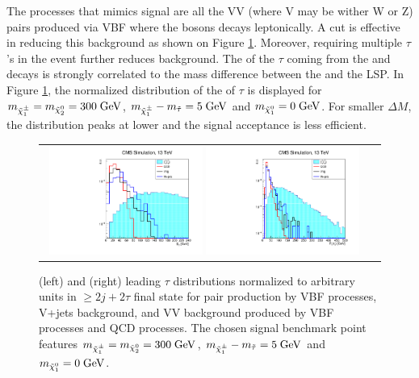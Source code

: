 The processes that mimics signal are all the VV (where V may be wither W or Z) pairs produced via VBF where the bosons decays leptonically. A \met cut is eﬀective in reducing this background as shown on Figure \ref{fig:VBF_met_pttau}. Moreover, requiring multiple $\tau$’s in the event further reduces background. The \pt of the \ensuremath{\tau} coming from the \charginopm and \neutralinotwo decays is strongly correlated to the mass difference between the \charginopm and the \neutralinoone LSP. In Figure \ref{fig:VBF_met_pttau}, the normalized distribution of the \pt of \ensuremath{\tau} is displayed for \ensuremath{m_{\charginopm} = m_{\neutralinotwo} = 300\gev}, \ensuremath{m_{\charginopm} - m_{\tilde{\tau}} = 5\gev} and \ensuremath{m_{\neutralinoone} = 0\gev}. For smaller \ensuremath{\Delta M}, the distribution peaks at lower \pt and the signal acceptance is less efficient.

\begin{figure}[tbh!]
	\centering
	\begin{tabular}{cc}
		\includegraphics[width=0.48\textwidth]{analysis/pics/h_met_prospects13tev.pdf}
		\includegraphics[width=0.48\textwidth]{analysis/pics/h_tau1pt_prospects13tev.pdf} 		
	\end{tabular}
	\caption{(left) \met and (right) leading \ensuremath{\tau} \pt distributions normalized to arbitrary units in \ensuremath{\geq 2j + 2\tau} final state for \charginopm \charginopm pair production by VBF processes, V+jets background, and VV background produced by VBF processes and QCD processes. The chosen signal benchmark point features \ensuremath{m_{\charginopm} = m_{\neutralinotwo} = 300\gev}, \ensuremath{m_{\charginopm} - m_{\tilde{\tau}} = 5\gev} and \ensuremath{m_{\neutralinoone} = 0\gev}.}
	\label{fig:VBF_met_pttau}
\end{figure}


